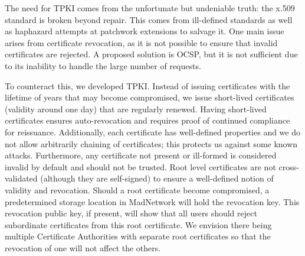 The need for TPKI comes from the unfortunate but undeniable truth:
the x.509 standard is broken beyond repair.
This comes from ill-defined standards as well as haphazard attempts
at patchwork extensions to salvage it.
One main issue arises from certificate revocation, as it is not
possible to ensure that invalid certificates are rejected.
A proposed solution is OCSP, but it is not sufficient due to its
inability to handle the large number of requests.

To counteract this, we developed TPKI.
Instead of issuing certificates with the lifetime of years that
may become compromised, we issue short-lived certificates (validity
around one day) that are regularly renewed.
Having short-lived certificates ensures auto-revocation and requires
proof of continued compliance for reissuance.
Additionally, each certificate has well-defined properties and we
do not allow arbitrarily chaining of certificates; this protects
us against some known attacks.
Furthermore, any certificate not present or ill-formed is considered
invalid by default and should not be trusted.
Root level certificates are not cross-validated (although they
are self-signed) to ensure a well-defined notion of validity
and revocation.
Should a root certificate become compromised, a predetermined storage
location in MadNetwork will hold the revocation key.
This revocation public key, if present, will show that all users
should reject subordinate certificates from this root certificate.
We envision there being multiple Certificate Authorities with separate
root certificates so that the revocation of one will not affect
the others.

